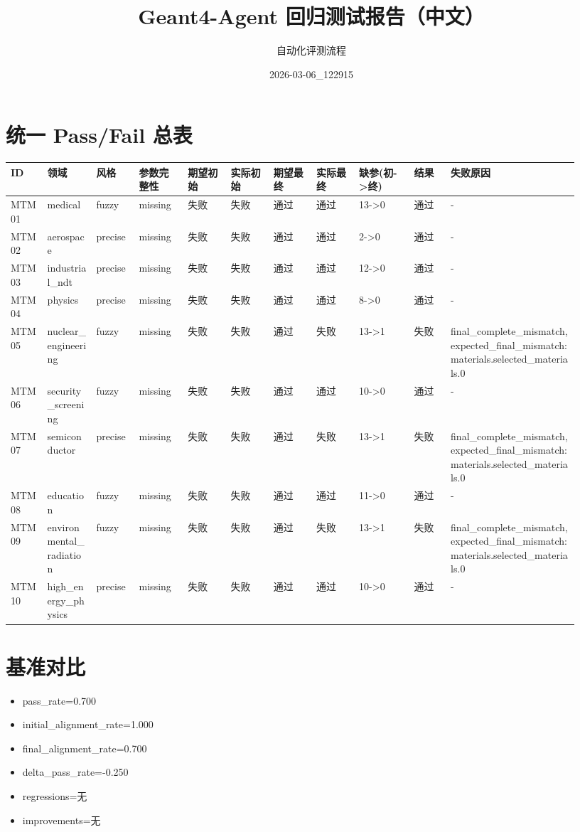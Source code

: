 \documentclass[11pt]{ctexart}
\title{Geant4-Agent 回归测试报告（中文）}
\author{自动化评测流程}
\date{2026-03-06\_122915}
\begin{document}
\maketitle
\section{统一 Pass/Fail 总表}
\begin{longtable}{p{0.06\linewidth}p{0.08\linewidth}p{0.07\linewidth}p{0.08\linewidth}p{0.07\linewidth}p{0.07\linewidth}p{0.07\linewidth}p{0.07\linewidth}p{0.09\linewidth}p{0.06\linewidth}p{0.21\linewidth}}
\toprule
ID & 领域 & 风格 & 参数完整性 & 期望初始 & 实际初始 & 期望最终 & 实际最终 & 缺参(初->终) & 结果 & 失败原因 \\
\midrule
MTM01 & medical & fuzzy & missing & 失败 & 失败 & 通过 & 通过 & 13->0 & 通过 & - \\
MTM02 & aerospace & precise & missing & 失败 & 失败 & 通过 & 通过 & 2->0 & 通过 & - \\
MTM03 & industrial\_ndt & precise & missing & 失败 & 失败 & 通过 & 通过 & 12->0 & 通过 & - \\
MTM04 & physics & precise & missing & 失败 & 失败 & 通过 & 通过 & 8->0 & 通过 & - \\
MTM05 & nuclear\_engineering & fuzzy & missing & 失败 & 失败 & 通过 & 失败 & 13->1 & 失败 & final\_complete\_mismatch, expected\_final\_mismatch:materials.selected\_materials.0 \\
MTM06 & security\_screening & fuzzy & missing & 失败 & 失败 & 通过 & 通过 & 10->0 & 通过 & - \\
MTM07 & semiconductor & precise & missing & 失败 & 失败 & 通过 & 失败 & 13->1 & 失败 & final\_complete\_mismatch, expected\_final\_mismatch:materials.selected\_materials.0 \\
MTM08 & education & fuzzy & missing & 失败 & 失败 & 通过 & 通过 & 11->0 & 通过 & - \\
MTM09 & environmental\_radiation & fuzzy & missing & 失败 & 失败 & 通过 & 失败 & 13->1 & 失败 & final\_complete\_mismatch, expected\_final\_mismatch:materials.selected\_materials.0 \\
MTM10 & high\_energy\_physics & precise & missing & 失败 & 失败 & 通过 & 通过 & 10->0 & 通过 & - \\
\bottomrule
\end{longtable}
\section{基准对比}
\begin{itemize}
\item pass\_rate=0.700
\item initial\_alignment\_rate=1.000
\item final\_alignment\_rate=0.700
\item delta\_pass\_rate=-0.250
\item regressions=无
\item improvements=无
\end{itemize}
\appendix
\end{document}
